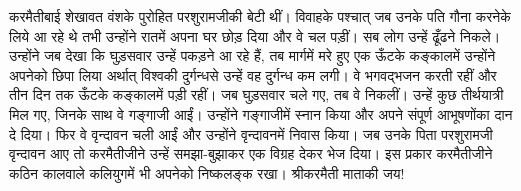 \begin{sloppypar}\justifying{}
करमैतीबाई शेखावत वंशके पुरोहित परशुरामजीकी बेटी थीं। विवाहके पश्चात् जब उनके पति गौना करनेके लिये आ रहे थे तभी उन्होंने रातमें अपना घर छोड़ दिया और वे चल पड़ीं। सब लोग उन्हें ढूँढने निकले। उन्होंने जब देखा कि घुड़सवार उन्हें पकड़ने आ रहे हैं, तब मार्गमें मरे हुए एक ऊँटके कङ्कालमें उन्होंने अपनेको छिपा लिया अर्थात् विश्वकी दुर्गन्धसे उन्हें वह दुर्गन्ध कम लगी। वे भगवद्भजन करती रहीं और तीन दिन तक ऊँटके कङ्कालमें पड़ी रहीं। जब घुड़सवार चले गए, तब वे निकलीं। उन्हें कुछ तीर्थयात्री मिल गए, जिनके साथ वे गङ्गाजी आईं। उन्होंने गङ्गाजीमें स्नान किया और अपने संपूर्ण आभूषणोंका दान दे दिया। फिर वे वृन्दावन चली आईं और उन्होंने वृन्दावनमें निवास किया। जब उनके पिता परशुरामजी वृन्दावन आए तो करमैतीजीने उन्हें समझा-बुझाकर एक विग्रह देकर भेज दिया। इस प्रकार करमैतीजीने कठिन कालवाले कलियुगमें भी अपनेको निष्कलङ्क रखा। श्रीकरमैती माताकी जय!
\end{sloppypar}



